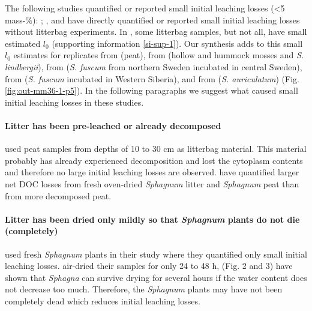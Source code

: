 \documentclass[bg, manuscript]{copernicus}
\begin{document}
The following studies quantified or reported small initial leaching losses (\textless5 mass-\%): \citet{Coulson.1978}; \citet{Thormann.2002}, and \citet{Castells.2005} have directly quantified or reported small initial leaching losses without litterbag experiments. In \citet{Moore.2007}, some litterbag samples, but not all, have small estimated \(l_0\) (supporting information \ref{si-sup-1}). Our synthesis adds to this small \(l_0\) estimates for replicates from \citet{Prevost.1997} (peat), from \citet{Bartsch.1985} (hollow and hummock mosses and \emph{S. lindbergii}), from \citet{Breeuwer.2008} (\emph{S. fuscum} from northern Sweden incubated in central Sweden), from \citet{Golovatskaya.2017} (\emph{S. fuscum} incubated in Western Siberia), and from \citet{Trinder.2008} (\emph{S. auriculatum}) (Fig. \ref{fig:out-mm36-1-p5}). In the following paragraphs we suggest what caused small initial leaching losses in these studies.

\paragraph*{Litter has been pre-leached or already decomposed}

\citet{Prevost.1997} used peat samples from depths of 10 to 30 cm as litterbag material. This material probably has already experienced decomposition and lost the cytoplasm contents and therefore no large initial leaching losses are observed. \citet{Moore.2001} have quantified larger net DOC losses from fresh oven-dried \emph{Sphagnum} litter and \emph{Sphagnum} peat than from more decomposed peat.

\paragraph*{\texorpdfstring{Litter has been dried only mildly so that \emph{Sphagnum} plants do not die (completely)}{Litter has been dried only mildly so that Sphagnum plants do not die (completely)}}

\citet{Castells.2005} used fresh \emph{Sphagnum} plants in their study where they quantified only small initial leaching losses. \citet{Bartsch.1985} air-dried their samples for only 24 to 48 h, \citet{Schipperges.1998} (Fig. 2 and 3) have shown that \emph{Sphagna} can survive drying for several hours if the water content does not decrease too much. Therefore, the \emph{Sphagnum} plants may have not been completely dead which reduces initial leaching losses.
\end{document}
